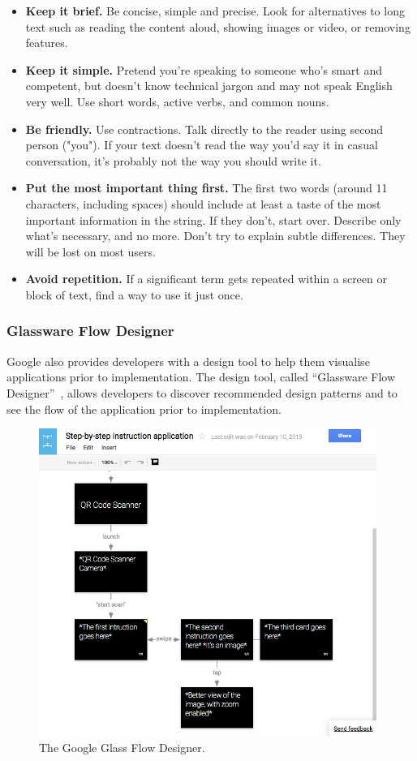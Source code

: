 \begin{itemize}
	\item \textbf{Keep it brief.} Be concise, simple and precise. Look for alternatives to long text such as reading the content aloud, showing images or video, or removing features.
	\item \textbf{Keep it simple.} Pretend you're speaking to someone who's smart and competent, but doesn't know technical jargon and may not speak English very well. Use short words, active verbs, and common nouns.
	\item \textbf{Be friendly.} Use contractions. Talk directly to the reader using second person ("you"). If your text doesn't read the way you'd say it in casual conversation, it's probably not the way you should write it.
	\item \textbf{Put the most important thing first.} The first two words (around 11 characters, including spaces) should include at least a taste of the most important information in the string. If they don't, start over. Describe only what's necessary, and no more. Don't try to explain subtle differences. They will be lost on most users.
	\item \textbf{Avoid repetition.} If a significant term gets repeated within a screen or block of text, find a way to use it just once.
\end{itemize}

\subsubsection{Glassware Flow Designer}
Google also provides developers with a design tool to help them visualise applications prior to implementation. The design tool, called ``Glassware Flow Designer''~\cite{glasswareFlowDesigner}, allows developers to discover recommended design patterns and to see the flow of the application prior to implementation.

	\begin{figure}[ht!]
		\centering
		\includegraphics[width=110mm]{images/glaswareFlowDesignerScreenshot}
		\caption{The Google Glass Flow Designer.}
		\label{GlassDesignStyle}
	\end{figure}